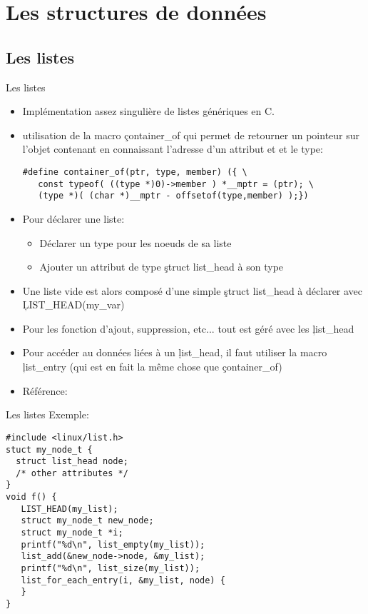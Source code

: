 \section{Les structures de données}

\subsection{Les listes}

\begin{frame}[fragile=singleslide]{Les listes}
  \begin{itemize} 
  \item Implémentation assez singulière de listes génériques en C. 
  \item  utilisation  de  la  macro  \c{container_of}  qui  permet  de
    retourner  un  pointeur   sur  l'objet  contenant  en  connaissant
    l'adresse d'un attribut et et le type:
    \begin{lstlisting} 
#define container_of(ptr, type, member) ({ \ 
   const typeof( ((type *)0)->member ) *__mptr = (ptr); \
   (type *)( (char *)__mptr - offsetof(type,member) );})
    \end{lstlisting} 
  \item Pour déclarer une liste: 
    \begin{itemize}
    \item Déclarer un type pour les noeuds de sa liste
    \item Ajouter un attribut de type \c{struct list_head} à son type
    \end{itemize} 
  \item   Une   liste   vide    est   alors   composé   d'une   simple
    \c{struct list_head} à déclarer avec \c{LIST_HEAD(my_var)}
  \item Pour  les fonction d'ajout, suppression, etc...  tout est géré
    avec les \c{list_head}
  \item  Pour accéder  au données  liées à  un \c{list_head},  il faut
    utiliser la  macro \c{list_entry} (qui  est en fait la  même chose
    que \c{container_of})
  \item Référence: \file{linux/list.h}
  \end{itemize}  
\end{frame}

\begin{frame}[fragile=singleslide]{Les listes}
  Exemple: 
  \begin{lstlisting}
#include <linux/list.h>
stuct my_node_t {
  struct list_head node;
  /* other attributes */
}
void f() {
   LIST_HEAD(my_list);
   struct my_node_t new_node; 
   struct my_node_t *i; 
   printf("%d\n", list_empty(my_list));
   list_add(&new_node->node, &my_list);
   printf("%d\n", list_size(my_list));
   list_for_each_entry(i, &my_list, node) {
   }
} 
  \end{lstlisting} 
\end{frame} 

